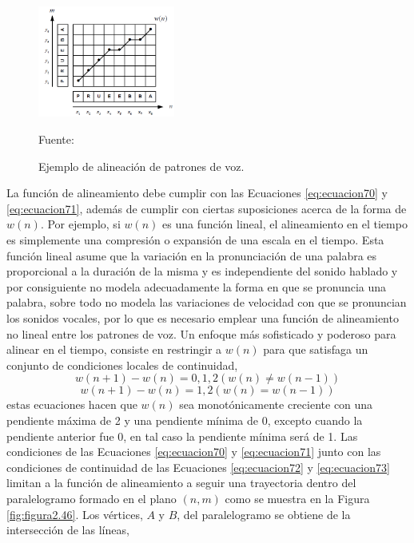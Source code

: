\begin{enumerate}
\begin{figure}[H]
\begin{center}
\includegraphics[width=0.4\textwidth]{Imagenes/Cap2/image046}
\end{center}
\begin{center}
\vskip -0.5cm
\caption{\small{Ejemplo de alineación de patrones de voz.}}
\label{fig:figura2.45}
{\small{Fuente: \cite{rabiner}}}
\end{center}
\end{figure}
La función de alineamiento debe cumplir con las Ecuaciones \eqref{eq:ecuacion70} y \eqref{eq:ecuacion71}, además de cumplir con ciertas suposiciones acerca de la forma de $w(n)$. Por ejemplo, si $w(n)$ es una función lineal, el alineamiento en el tiempo es simplemente una compresión o expansión de una escala en el tiempo. Esta función lineal asume que la variación en la pronunciación de una palabra es proporcional a la duración de la misma y es independiente del sonido hablado y por consiguiente no modela adecuadamente la forma en que se pronuncia una palabra, sobre todo no modela las variaciones de velocidad con que se pronuncian los sonidos vocales, por lo que es necesario emplear una función de alineamiento no lineal entre los patrones de voz.
\vskip 0.5cm
Un enfoque más sofisticado y poderoso para alinear en el tiempo, consiste en restringir a $w(n)$ para que satisfaga un conjunto de condiciones locales de continuidad,
\begin{equation}
\label{eq:ecuacion72}
w(n+1) - w(n) = 0,1,2(w(n) \neq w(n-1))
\end{equation}
\begin{equation}
\label{eq:ecuacion73}
w(n+1) - w(n) = 1,2(w(n) = w(n-1))
\end{equation}
estas ecuaciones hacen que $w(n)$ sea monotónicamente creciente con una pendiente máxima de 2 y una pendiente mínima de 0, excepto cuando la pendiente anterior fue 0, en tal caso la pendiente mínima será de 1. 
\vskip 0.5cm
Las condiciones de las Ecuaciones \eqref{eq:ecuacion70} y \eqref{eq:ecuacion71} junto con las condiciones de continuidad de las Ecuaciones \eqref{eq:ecuacion72} y \eqref{eq:ecuacion73} limitan a la función de alineamiento a seguir una trayectoria dentro del paralelogramo formado en el plano $(n, m)$ como se muestra en la Figura \ref{fig:figura2.46}. Los vértices, $A$ y $B$, del paralelogramo se obtiene de la intersección de las líneas,

\end{enumerate}
